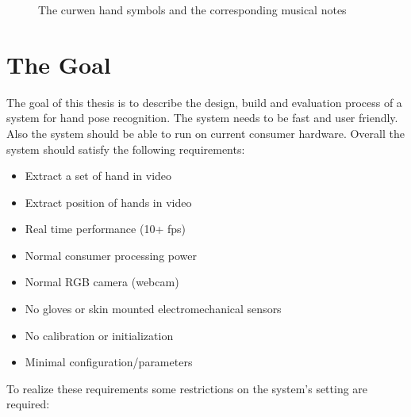 \begin{figure}[htbp]
	\center{}
	\hspace{0.03\linewidth}
	\caption{The curwen hand symbols and the corresponding musical notes}
	\label{fig:curwennotes}
\end{figure}


\section{The Goal}
\label{sec:goal}
The goal of this thesis is to describe the design, build and evaluation process of a system for hand pose recognition. The system needs to be fast and user friendly. Also the system should be able to run on current consumer hardware. Overall the system should satisfy the following requirements:

\begin{itemize}
	\item Extract a set of hand in video
	\item Extract position of hands in video
	\item Real time performance (10+ fps)
	\item Normal consumer processing power
	\item Normal RGB camera (webcam)
	\item No gloves or skin mounted electromechanical sensors
	\item No calibration or initialization
	\item Minimal configuration/parameters
\end{itemize}
	
To realize these requirements some restrictions on the system's setting are required:

